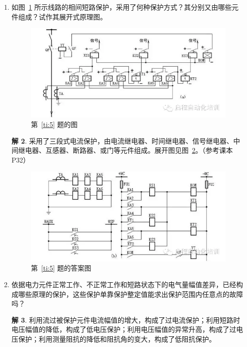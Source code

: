 \documentclass[zihao=-4,fontset = none]{ctexart}
\theoremstyle{definition}
\newtheorem*{solution}{解}
\begin{document}
\begin{enumerate}
\begin{solution}
    相间短路与接地短路所构成的故障环路的最明显差异是：接地短路的故障环路为“相—地"故障环路，即短路电流在故障相与大地之间流通；对于相间短路，故障环路为“相—相”故障环路，即短路电流仅在故障相之间流通，不流向大地。
  \end{solution}
  \item \label{ti:5}如图~\ref{fig:ti-5} 所示线路的相间短路保护，采用了何种保护方式？其分别又由哪些元件组成？试作其展开式原理图。
  \begin{figure}
    \centering
    \includegraphics[width=\textwidth]{ti5.png}
    \caption{第~\ref{ti:5} 题的图}\label{fig:ti-5}
  \end{figure}
  \begin{solution}
    采用了三段式电流保护，由电流继电器、时间继电器、信号继电器、中间继电器、互感器、断路器、或门等元件组成。展开图见图~\ref{fig:ti-5-daan}。（参考课本P32）
    \begin{figure}
      \centering
      \includegraphics[width=\textwidth]{ti-5-daan.png}
      \caption{第~\ref{ti:5} 题的答案图}\label{fig:ti-5-daan}
    \end{figure}
  \end{solution}
  \item 依据电力元件正常工作、不正常工作和短路状态下的电气量幅值差异，已经构成哪些原理的保护，这些保护单靠保护整定值能求出保护范围内任意点的故障吗？
  \begin{solution}
    利用流过被保护元件电流幅值的增大，构成了过电流保护；利用短路时电压幅值的降低，构成了低电压保护；利用电压幅值的异常升高，构成了过电压保护；利用测量阻抗的降低和阻抗角的变大，构成了低阻抗保护。


\end{solution}
\end{enumerate}
\end{document}
